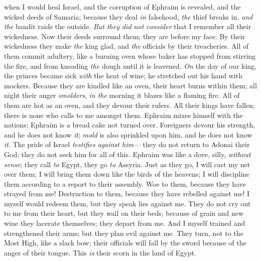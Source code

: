 \begin{biblechapter} %
\verse when I would heal Israel, 
and the corruption of Ephraim is revealed, 
and the wicked deeds of Samaria; 
because they deal \textit{in} falsehood, 
\textit{the} thief breaks in, 
\textit{and the} bandit raids the outside.
\verse \textit{But they did not consider} 
that I remember all their wickedness. 
Now their deeds surround them; 
they are before my face.
\verse By their wickedness they make \textit{the} king glad, 
and \textit{the} officials by their treacheries.
\verse All of them commit adultery, 
like a burning oven 
whose baker has stopped from stirring the fire, 
and from kneading \textit{the} dough until it is leavened.
\verse \textit{On} the day of our king, the princes 
became sick \textit{with} the heat of wine; 
he stretched out his hand with mockers.
\verse Because they are kindled like an oven, 
their heart burns within them; 
all night their anger \textit{smolders}, 
\textit{in the} morning it blazes like a flaming fire.
\verse All of them are hot as an oven, 
and they devour their rulers. 
All their kings have fallen; 
there is none who calls to me amongst them.
\verse Ephraim mixes himself 
with the nations; 
Ephraim is a bread cake 
not turned over.
\verse Foreigners devour his strength, 
and he does not know \textit{it}; 
\textit{mold} is also sprinkled upon him, 
and he does not know \textit{it}.
\verse The pride of Israel \textit{testifies against him}— 
they do not return to Adonai their God; 
they do not seek him for all of this.
\verse Ephraim was like a dove, 
silly, \textit{without sense}; 
they call \textit{to} Egypt, 
they go \textit{to} Assyria.
\verse Just as they go, I will cast my net 
over them; 
I will bring them down 
like the birds of the heavens; 
I will discipline them 
according to a report to their assembly.
\verse Woe to them, because they have strayed from me! 
Destruction to them, because they have rebelled against me! 
I myself would redeem them, 
but they speak lies against me.
\verse They do not cry out to me from their heart, 
but they wail on their beds; 
because of grain and new wine they lacerate themselves; 
they depart from me.
\verse And I myself trained 
and strengthened their arms; 
but they plan evil against me.
\verse They turn, not to the Most High, 
like a slack bow; 
their officials will fall by the sword 
because of the anger of their tongue. 
This \textit{is} their scorn 
in the land of Egypt.
\end{biblechapter}

